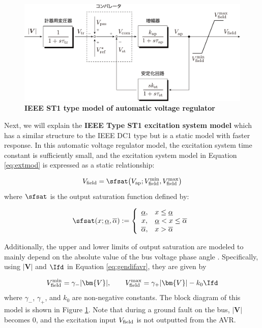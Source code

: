 \documentclass[graybox, envcountchap]{svmult}
\begin{document}
\begin{figure}[t]
\centering
\includegraphics[width = .85\linewidth]{figs/avrst1}
\medskip
\caption{\textbf{IEEE ST1 type model of automatic voltage regulator}}
\label{fig:avrst1}
\medskip
\end{figure}

Next, we will explain the \textbf{IEEE Type ST1 excitation system model} which
has a similar structure to the IEEE DC1 type but is a static model with faster
response. In this automatic voltage regulator model, the excitation system time
constant is sufficiently small, and the excitation system model in Equation
\ref{eq:extmod} is expressed as a static relationship:

\[
  V_{\rm field} = \sfsat \bigl( V_{\rm ap};V_{\rm field}^{\rm min},V_{\rm field}^{\rm max} \bigr)
\]
where $\sfsat$ is the output saturation function defined by:

\[
  \sfsat(x;\underline{\alpha},\overline{\alpha}) := \left\{
  \begin{array}{cl}
  \underline{\alpha}, & x \leq \underline{\alpha} \\
  x, & \underline{\alpha} < x \leq \overline{\alpha} \\
  \overline{\alpha}, & x> \overline{\alpha}
  \end{array}
  \right.
\]

Additionally, the upper and lower limits of output saturation are modeled to
mainly depend on the absolute value of the bus voltage phase angle \cite[Section
8.63]{kundur1994power}. Specifically, using $|\bm{V}|$ and $\Ifd$ in Equation
\ref{eq:gendifavr}, they are given by

\[
  V_{\rm field}^{\rm min} = \gamma_{-} |\bm{V}|, \qquad
  V_{\rm field}^{\rm max} = \gamma_{+} |\bm{V}|
  -
  k_0 \Ifd
\]
where $\gamma_{-}$, $\gamma_{+}$, and $k_{0}$ are non-negative constants. The
block diagram of this model is shown in Figure \ref{fig:avrst1}. Note that during
a ground fault on the bus, $|\bm{V}|$ becomes 0, and the excitation input
$V_{\rm field}$ is not outputted from the AVR.
\end{document}
